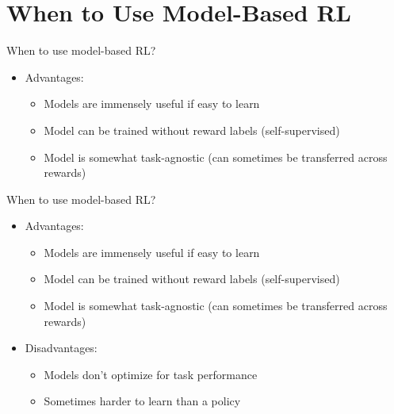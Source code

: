 \section{When to Use Model-Based RL}
\begin{frame}{When to use model-based RL?}
\begin{itemize}
    \item Advantages:
    \begin{itemize}
        \item Models are immensely useful if easy to learn
        \item Model can be trained without reward labels (self-supervised)
        \item Model is somewhat task-agnostic (can sometimes be transferred
              across rewards)
    \end{itemize}
\end{itemize}
\end{frame}

\begin{frame}{When to use model-based RL?}
\begin{itemize}
    \item Advantages:
    \begin{itemize}
        \item Models are immensely useful if easy to learn
        \item Model can be trained without reward labels (self-supervised)
        \item Model is somewhat task-agnostic (can sometimes be transferred
              across rewards)
    \end{itemize}
    \item Disadvantages:
    \begin{itemize}
        \item Models don't optimize for task performance
        \item Sometimes harder to learn than a policy
    \end{itemize}
\end{itemize}
\end{frame}

